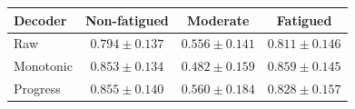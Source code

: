\begin{tabular}{lccc}
\toprule
Decoder & Non-fatigued & Moderate & Fatigued \\
\midrule
Raw & $0.794 \pm 0.137$ & $0.556 \pm 0.141$ & $0.811 \pm 0.146$ \\
Monotonic & $0.853 \pm 0.134$ & $0.482 \pm 0.159$ & $0.859 \pm 0.145$ \\
Progress & $0.855 \pm 0.140$ & $0.560 \pm 0.184$ & $0.828 \pm 0.157$ \\
\bottomrule
\end{tabular}